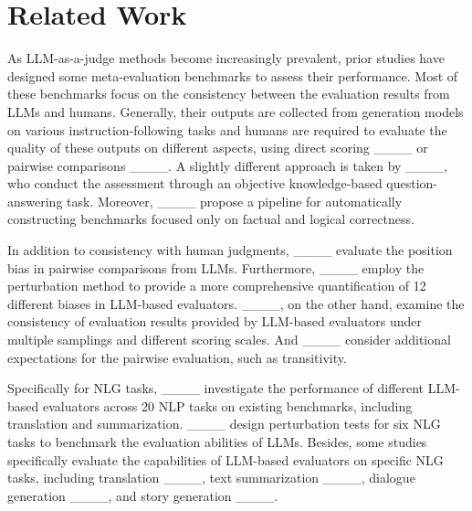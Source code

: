 \section{Related Work}
As LLM-as-a-judge methods become increasingly prevalent, prior studies have designed some meta-evaluation benchmarks to assess their performance. Most of these benchmarks focus on the consistency between the evaluation results from LLMs and humans. Generally, their outputs are collected from generation models on various instruction-following tasks and humans are required to evaluate the quality of these outputs on different aspects, using direct scoring ____ or pairwise comparisons ____. A slightly different approach is taken by ____, who conduct the assessment through an objective knowledge-based question-answering task. Moreover, ____ propose a pipeline for automatically constructing benchmarks focused only on factual and logical correctness.

In addition to consistency with human judgments, ____ evaluate the position bias in pairwise comparisons from LLMs. Furthermore, ____ employ the perturbation method to provide a more comprehensive quantification of 12 different biases in LLM-based evaluators. ____, on the other hand, examine the consistency of evaluation results provided by LLM-based evaluators under multiple samplings and different scoring scales. And ____ consider additional expectations for the pairwise evaluation, such as transitivity.

Specifically for NLG tasks, ____ investigate the performance of different LLM-based evaluators across 20 NLP tasks on existing benchmarks, including translation and summarization. ____ design perturbation tests for six NLG tasks to benchmark the evaluation abilities of LLMs. Besides, some studies specifically evaluate the capabilities of LLM-based evaluators on specific NLG tasks, including translation ____, text summarization ____, dialogue generation ____, and story generation ____.